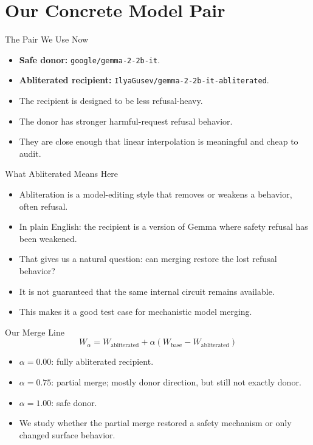 \documentclass[aspectratio=169]{beamer}
\begin{document}
\section{Our Concrete Model Pair}

\begin{frame}{The Pair We Use Now}
\small
\begin{itemize}
  \item \textbf{Safe donor:} \texttt{google/gemma-2-2b-it}.
  \item \textbf{Abliterated recipient:} \texttt{IlyaGusev/gemma-2-2b-it-abliterated}.
  \item The recipient is designed to be less refusal-heavy.
  \item The donor has stronger harmful-request refusal behavior.
  \item They are close enough that linear interpolation is meaningful and cheap to audit.
\end{itemize}
\end{frame}

\begin{frame}{What Abliterated Means Here}
\small
\begin{itemize}
  \item Abliteration is a model-editing style that removes or weakens a behavior, often refusal.
  \item In plain English: the recipient is a version of Gemma where safety refusal has been weakened.
  \item That gives us a natural question: can merging restore the lost refusal behavior?
  \item It is not guaranteed that the same internal circuit remains available.
  \item This makes it a good test case for mechanistic model merging.
\end{itemize}
\end{frame}

\begin{frame}{Our Merge Line}
\small
\[
W_{\alpha}=W_{\mathrm{abliterated}}+\alpha(W_{\mathrm{base}}-W_{\mathrm{abliterated}})
\]
\begin{itemize}
  \item \(\alpha=0.00\): fully abliterated recipient.
  \item \(\alpha=0.75\): partial merge; mostly donor direction, but still not exactly donor.
  \item \(\alpha=1.00\): safe donor.
  \item We study whether the partial merge restored a safety mechanism or only changed surface behavior.
\end{itemize}

\end{frame}
\end{document}
